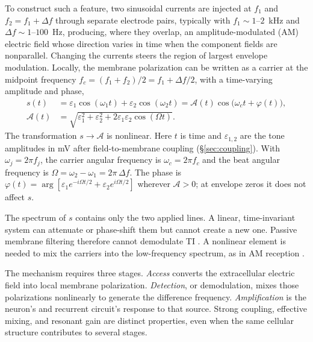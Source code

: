 \documentclass[a4paper]{article}
\begin{document}
To construct such a feature, two sinusoidal currents are injected at $f_1$ and
$f_2=f_1+\Delta f$ through separate electrode pairs, typically with $f_1\sim1$--$2$~kHz
and $\Delta f\sim1$--$100$~Hz, producing, where they overlap, an amplitude-modulated (AM)
electric field whose direction varies in time when the component fields are nonparallel. Changing the
currents steers the region of largest envelope modulation. Locally, the membrane polarization can be written as a carrier at the midpoint
frequency $f_c=(f_1+f_2)/2=f_1+\Delta f/2$, with a time-varying amplitude and phase,
\begin{equation}
\begin{aligned}
s(t)&=\varepsilon_1\cos(\omega_1 t)+\varepsilon_2\cos(\omega_2 t)
     =\mathcal A(t)\cos\!\big(\omega_c t+\varphi(t)\big),\\
\mathcal A(t)&=\sqrt{\varepsilon_1^2+\varepsilon_2^2
                    +2\varepsilon_1\varepsilon_2\cos(\Omega t)}.
\end{aligned}
\label{eq:am}
\end{equation}
 The transformation $s\rightarrow\mathcal A$ is nonlinear.  
Here $t$ is time and $\varepsilon_{1,2}$ are the tone amplitudes in mV after
field-to-membrane coupling (\S\ref{sec:coupling}). With $\omega_j=2\pi f_j$,
the carrier angular frequency is $\omega_c=2\pi f_c$ and
the beat angular frequency is $\Omega=\omega_2-\omega_1=2\pi\,\Delta f$.
The phase is
$\varphi(t)=\arg[\varepsilon_1e^{-i\Omega t/2}+\varepsilon_2e^{i\Omega t/2}]$
wherever $\mathcal A>0$; at envelope zeros it does not affect $s$.

The spectrum of $s$ contains only the two
applied lines. A linear, time-invariant system can attenuate or phase-shift them but
cannot create a new one. Passive membrane filtering therefore cannot demodulate TI
\cite{mirzakhalili2020}.
A nonlinear element is needed to mix the carriers into the
low-frequency spectrum, as in AM reception \cite{nahin2001}.


The mechanism requires three stages. \emph{Access} converts the extracellular electric field
into local membrane polarization. \emph{Detection}, or demodulation, mixes those
polarizations nonlinearly to generate the difference frequency. \emph{Amplification} is the
neuron's and recurrent circuit's response to that source. Strong coupling,
effective mixing, and resonant gain are distinct properties, even when the
same cellular structure contributes to several stages.
\end{document}
